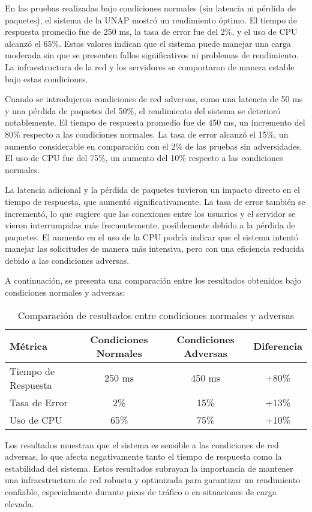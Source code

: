 \documentclass{article}
\begin{document}
En las pruebas realizadas bajo condiciones normales (sin latencia ni pérdida de paquetes), el sistema de la UNAP mostró un rendimiento óptimo. El tiempo de respuesta promedio fue de 250 ms, la tasa de error fue del 2\%, y el uso de CPU alcanzó el 65\%. Estos valores indican que el sistema puede manejar una carga moderada sin que se presenten fallos significativos ni problemas de rendimiento. La infraestructura de la red y los servidores se comportaron de manera estable bajo estas condiciones.

Cuando se introdujeron condiciones de red adversas, como una latencia de 50 ms y una pérdida de paquetes del 50\%, el rendimiento del sistema se deterioró notablemente. El tiempo de respuesta promedio fue de 450 ms, un incremento del 80\% respecto a las condiciones normales. La tasa de error alcanzó el 15\%, un aumento considerable en comparación con el 2\% de las pruebas sin adversidades. El uso de CPU fue del 75\%, un aumento del 10\% respecto a las condiciones normales.

La latencia adicional y la pérdida de paquetes tuvieron un impacto directo en el tiempo de respuesta, que aumentó significativamente. La tasa de error también se incrementó, lo que sugiere que las conexiones entre los usuarios y el servidor se vieron interrumpidas más frecuentemente, posiblemente debido a la pérdida de paquetes. El aumento en el uso de la CPU podría indicar que el sistema intentó manejar las solicitudes de manera más intensiva, pero con una eficiencia reducida debido a las condiciones adversas.

A continuación, se presenta una comparación entre los resultados obtenidos bajo condiciones normales y adversas:

\begin{table}[h!]
\centering
\caption{Comparación de resultados entre condiciones normales y adversas}
\label{tab:comparacion_resultados}
\begin{tabular}{|l|c|c|c|}
\hline
\textbf{Métrica} & \textbf{Condiciones Normales} & \textbf{Condiciones Adversas} & \textbf{Diferencia} \\ \hline
Tiempo de Respuesta & 250 ms & 450 ms & +80\% \\ \hline
Tasa de Error & 2\% & 15\% & +13\% \\ \hline
Uso de CPU & 65\% & 75\% & +10\% \\ \hline
\end{tabular}
\end{table}

Los resultados muestran que el sistema es sensible a las condiciones de red adversas, lo que afecta negativamente tanto el tiempo de respuesta como la estabilidad del sistema. Estos resultados subrayan la importancia de mantener una infraestructura de red robusta y optimizada para garantizar un rendimiento confiable, especialmente durante picos de tráfico o en situaciones de carga elevada.
\end{document}
